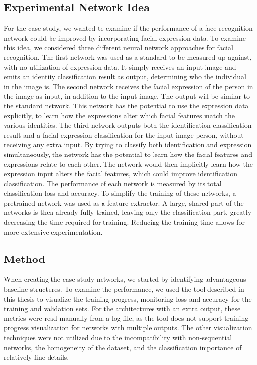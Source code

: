 \subsection{Experimental Network Idea}

For the case study, we wanted to examine if the performance of a face recognition network could be improved by incorporating facial expression data. To examine this idea, we considered three different neural network approaches for facial recognition. The first network was used as a standard to be measured up against, with no utilization of expression data. It simply receives an input image and emits an identity classification result as output, determining who the individual in the image is. The second network receives the facial expression of the person in the image as input, in addition to the input image. The output will be similar to the standard network. This network has the potential to use the expression data explicitly, to learn how the expressions alter which facial features match the various identities. The third network outputs both the identification classification result and a facial expression classification for the input image person, without receiving any extra input. By trying to classify both identification and expression simultaneously, the network has the potential to learn how the facial features and expressions relate to each other. The network would then implicitly learn how the expression input alters the facial features, which could improve identification classification. The performance of each network is measured by its total classification loss and accuracy. To simplify the training of these networks, a pretrained network was used as a feature extractor. A large, shared part of the networks is then already fully trained, leaving only the classification part, greatly decreasing the time required for training. Reducing the training time allows for more extensive experimentation. 

\subsection{Method}

When creating the case study networks, we started by identifying advantageous baseline structures. To examine the performance, we used the tool described in this thesis to visualize the training progress, monitoring loss and accuracy for the training and validation sets. For the architectures with an extra output, these metrics were read manually from a log file, as the tool does not support training progress visualization for networks with multiple outputs. The other visualization techniques were not utilized due to the incompatibility with non-sequential networks, the homogeneity of the dataset, and the classification importance of relatively fine details. \\

